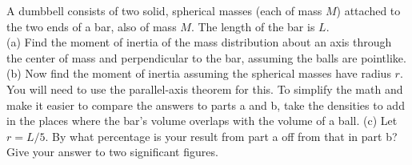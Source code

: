 A dumbbell consists of two solid, spherical masses (each of mass $M$)
attached to the two ends of a bar, also of mass $M$. The length of
the bar is $L$.\\
%
(a) Find the moment of inertia of the mass distribution about an axis
through the center of mass and perpendicular to the bar, assuming the balls
are pointlike.\answercheck\hwendpart
%
(b) Now find the moment of inertia assuming the spherical
masses have radius $r$. You will need to use the parallel-axis
theorem for this. To simplify the math and make it easier to compare the answers
to parts a and b, take the densities to add in the places where the bar's volume overlaps
with the volume of a ball.\answercheck\hwendpart
%
(c) Let $r=L/5$. By what percentage is your result from part a off from that in
part b? Give your answer to two significant
figures.\answercheck
